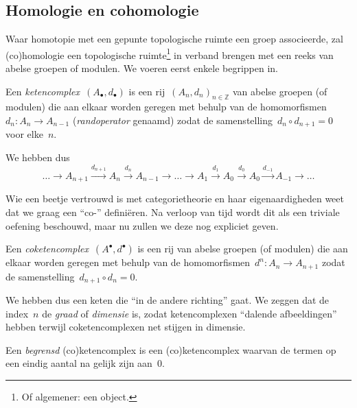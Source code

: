 \documentclass[a4paper,11pt,openany,oneside,article]{memoir}
\begin{document}
\subsection{Homologie en cohomologie}\label{subsection:homology-and-cohomology}
Waar homotopie met een gepunte topologische ruimte een groep associeerde, zal (co)homologie een topologische ruimte\footnote{Of algemener: een object.} in verband brengen met een reeks van abelse groepen of modulen. We voeren eerst enkele begrippen in.

\begin{definition}
  Een \emph{ketencomplex}~$(A_\bullet,d_\bullet)$ is een rij~$(A_n,d_n)_{n\in\mathbb{Z}}$ van abelse groepen (of modulen) die aan elkaar worden geregen met behulp van de homomorfismen~$d_n\colon A_n\to A_{n-1}$ (\emph{randoperator} genaamd) zodat de samenstelling~$d_n\circ d_{n+1}=0$ voor elke~$n$.

  We hebben dus
  \begin{equation}
    \ldots\longrightarrow A_{n+1}\overset{d_{n+1}}{\longrightarrow}A_n\overset{d_n}{\longrightarrow}A_{n-1}\longrightarrow\ldots\longrightarrow A_1\overset{d_1}{\longrightarrow}A_0\overset{d_0}{\longrightarrow}A_0\overset{d_{-1}}\longrightarrow A_{-1}\longrightarrow\ldots
  \end{equation}
\end{definition}

Wie een beetje vertrouwd is met categorietheorie en haar eigenaardigheden weet dat we graag een ``co-'' defini\"eren. Na verloop van tijd wordt dit als een triviale oefening beschouwd, maar nu zullen we deze nog expliciet geven.

\begin{definition}
  Een \emph{coketencomplex}~$(A^\bullet,d^\bullet)$ is een rij van abelse groepen (of modulen) die aan elkaar worden geregen met behulp van de homomorfismen~$d^n\colon A_n\to A_{n+1}$ zodat de samenstelling~$d_{n+1}\circ d_n=0$.
\end{definition}

We hebben dus een keten die ``in de andere richting'' gaat. We zeggen dat de index~$n$ de \emph{graad} of \emph{dimensie} is, zodat ketencomplexen ``dalende afbeeldingen'' hebben terwijl coketencomplexen net stijgen in dimensie.

\begin{definition}
  Een \emph{begrensd} (co)ketencomplex is een (co)ketencomplex waarvan de termen op een eindig aantal na gelijk zijn aan~$0$.
\end{definition}
\end{document}
